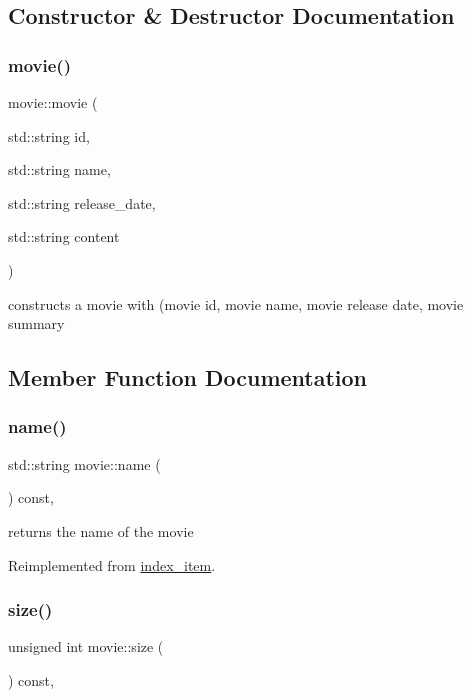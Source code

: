 \subsection{Constructor \& Destructor Documentation}
\mbox{\label{classmovie_ad902758807db02cb4a436249bf671296}} 
\subsubsection{\texorpdfstring{movie()}{movie()}}
{\footnotesize\ttfamily movie\+::movie (\begin{DoxyParamCaption}\item[{std\+::string}]{id,  }\item[{std\+::string}]{name,  }\item[{std\+::string}]{release\+\_\+date,  }\item[{std\+::string}]{content }\end{DoxyParamCaption})}

constructs a movie with (movie id, movie name, movie release date, movie summary 

\subsection{Member Function Documentation}
\mbox{\label{classmovie_ab8731bf52d5a7374ecc7ac297e3b99c3}} 
\subsubsection{\texorpdfstring{name()}{name()}}
{\footnotesize\ttfamily std\+::string movie\+::name (\begin{DoxyParamCaption}{ }\end{DoxyParamCaption}) const\hspace{0.3cm}{\ttfamily [override]}, {\ttfamily [virtual]}}

returns the name of the movie 

Reimplemented from \hyperlink{classindex__item_a1bcb5c577c3986549330c3aa283a6a5e}{index\+\_\+item}.

\mbox{\label{classmovie_a06e70f5ada3d72a74ad52a8b49f5cd70}} 
\subsubsection{\texorpdfstring{size()}{size()}}
{\footnotesize\ttfamily unsigned int movie\+::size (\begin{DoxyParamCaption}{ }\end{DoxyParamCaption}) const\hspace{0.3cm}{\ttfamily [override]}, {\ttfamily [virtual]}}


